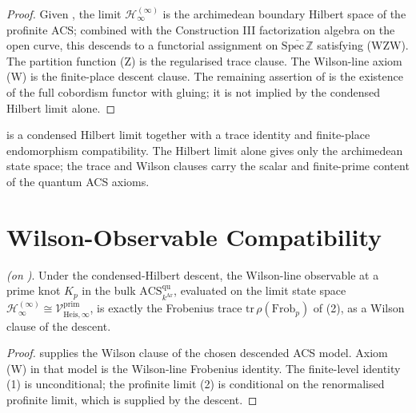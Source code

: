 \begin{proof}
Given ,
the limit \(\mathcal H^{(\infty)}_{\infty}\) is the archimedean
boundary Hilbert space of the profinite ACS; combined with the
Construction III factorization algebra on the open curve, this descends
to a functorial assignment on
\(\overline{\mathrm{Spec}\,\mathbb{Z}}\) satisfying (WZW). The
partition function (Z) is the regularised trace clause. The Wilson-line
axiom (W) is the finite-place descent clause.
The remaining assertion of  is the
existence of the full cobordism functor with gluing; it is not implied
by the condensed Hilbert limit alone.
\end{proof}

\begin{remark}
\label{v4-arith:w10-a:rem:named-theorem}
 is a condensed Hilbert
limit together with a trace identity and finite-place endomorphism
compatibility. The Hilbert limit alone gives only the archimedean
state space; the trace and Wilson clauses carry the scalar and
finite-prime content of the quantum ACS axioms.
\end{remark}

\section{Wilson-Observable Compatibility}
\label{v4-arith:w10-a:wilson-compat}

\begin{theorem}
\label{v4-arith:w10-a:thm:wilson-line-compat}
\ClaimStatusProvedHereConditional \emph{(on
)}. Under the
condensed-Hilbert descent, the Wilson-line observable at a prime
knot \(K_{p}\) in the bulk \(\mathrm{ACS}^{\mathrm{qu}}_{k^{\mathrm{Ar}}}\),
evaluated on the limit state space
\(\mathcal H^{(\infty)}_{\infty}\cong\mathcal V^{\mathrm{prim}}_{\mathrm{Heis},\infty}\),
is exactly the Frobenius trace \(\mathrm{tr}\,\rho(\mathrm{Frob}_{p})\)
of (2), as a Wilson clause of the
descent.
\end{theorem}

\begin{proof}
 supplies the Wilson
clause of the chosen descended ACS model. Axiom (W) in that model is
the Wilson-line Frobenius identity. The finite-level identity
(1) is unconditional; the profinite
limit (2) is conditional on the
renormalised profinite limit, which is supplied by the descent.
\end{proof}

